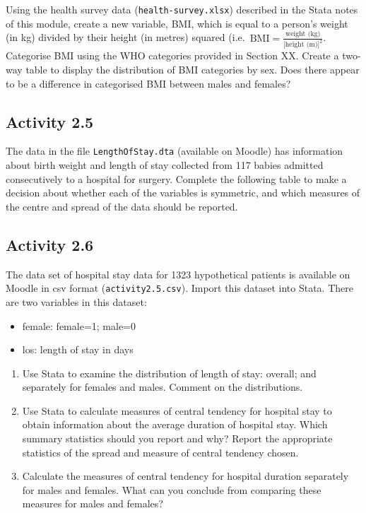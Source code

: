 \documentclass[
]{memoir}
\providecommand{\tightlist}{%
  \setlength{\itemsep}{0pt}\setlength{\parskip}{0pt}}
\begin{document}
Using the health survey data (\texttt{health-survey.xlsx}) described in the Stata notes of this module, create a new variable, BMI, which is equal to a person's weight (in kg) divided by their height (in metres) squared (i.e.~\(\text{BMI} = \frac{\text{weight (kg)}}{\text{[height (m)]}^2}\). Categorise BMI using the WHO categories provided in Section XX. Create a two-way table to display the distribution of BMI categories by sex. Does there appear to be a difference in categorised BMI between males and females?

\hypertarget{activity-2.5}{%
\subsection*{Activity 2.5}\label{activity-2.5}}

The data in the file \texttt{LengthOfStay.dta} (available on Moodle) has information about birth weight and length of stay collected from 117 babies admitted consecutively to a hospital for surgery. Complete the following table to make a decision about whether each of the variables is symmetric, and which measures of the centre and spread of the data should be reported.

\hypertarget{activity-2.6}{%
\subsection*{Activity 2.6}\label{activity-2.6}}

The data set of hospital stay data for 1323 hypothetical patients is available on Moodle in csv format (\texttt{activity2.5.csv}). Import this dataset into Stata. There are two variables in this dataset:

\begin{itemize}
\tightlist
\item
  female: female=1; male=0
\item
  los: length of stay in days
\end{itemize}

\begin{enumerate}
\def\labelenumi{\alph{enumi})}
\tightlist
\item
  Use Stata to examine the distribution of length of stay: overall; and separately for females and males. Comment on the distributions.
\item
  Use Stata to calculate measures of central tendency for hospital stay to obtain information about the average duration of hospital stay. Which summary statistics should you report and why? Report the appropriate statistics of the spread and measure of central tendency chosen.
\item
  Calculate the measures of central tendency for hospital duration separately for males and females. What can you conclude from comparing these measures for males and females?
\end{enumerate}
\end{document}
